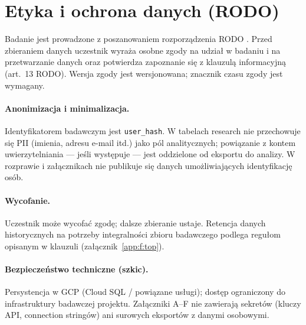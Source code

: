 \section{Etyka i ochrona danych (RODO)}
\label{ch06:sec:etyka}

Badanie jest prowadzone z poszanowaniem rozporządzenia RODO \parencite{eu2016gdpr}. Przed zbieraniem danych uczestnik wyraża osobne zgody na udział w badaniu i na przetwarzanie danych oraz potwierdza zapoznanie się z klauzulą informacyjną (art.~13 RODO). Wersja zgody jest wersjonowana; znacznik czasu zgody jest wymagany.

\paragraph{Anonimizacja i minimalizacja.}
Identyfikatorem badawczym jest \texttt{user\_hash}. W tabelach research nie przechowuje się PII (imienia, adresu e-mail itd.) jako pól analitycznych; powiązanie z kontem uwierzytelniania --- jeśli występuje --- jest oddzielone od eksportu do analizy. W rozprawie i załącznikach nie publikuje się danych umożliwiających identyfikację osób.

\paragraph{Wycofanie.}
Uczestnik może wycofać zgodę; dalsze zbieranie ustaje. Retencja danych historycznych na potrzeby integralności zbioru badawczego podlega regułom opisanym w klauzuli (załącznik~\ref{app:f:top}).

\paragraph{Bezpieczeństwo techniczne (szkic).}
Persystencja w GCP (Cloud SQL / powiązane usługi); dostęp ograniczony do infrastruktury badawczej projektu. Załączniki A--F nie zawierają sekretów (kluczy API, connection stringów) ani surowych eksportów z danymi osobowymi.
